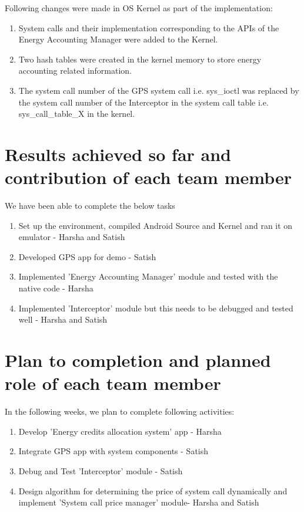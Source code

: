 Following changes were made in OS Kernel as part of the implementation: 

\begin{enumerate}	
	\item  System calls and their implementation corresponding to the APIs of the Energy Accounting Manager were added to the Kernel. 
	\item  Two hash tables were created in the kernel memory to store energy accounting related information. 
	\item The system call number of the GPS system call i.e. sys\_ioctl was replaced by the system call number of the Interceptor in the system call table i.e. sys\_call\_table\_X in the kernel.
\end{enumerate}

\section{Results achieved so far and contribution of each team member}

We have been able to complete the below tasks
\begin{enumerate}
	\item Set up the environment, compiled Android Source and Kernel and ran it on emulator - Harsha and Satish
	\item Developed GPS app for demo - Satish
	\item Implemented 'Energy Accounting Manager' module and tested with the native code - Harsha 
	\item Implemented 'Interceptor' module but this needs to be debugged and tested well - Harsha and Satish

\end{enumerate}

\section{Plan to completion and planned role of each team member}

 In the following weeks, we plan to complete following activities:
\begin{enumerate}
	\item Develop 'Energy credits allocation system' app - Harsha
	\item Integrate GPS app with system components   - Satish 
	\item Debug and Test 'Interceptor' module  - Satish
	\item Design algorithm for determining the price of system call dynamically and implement 'System call price manager' module- Harsha and Satish
	
\end{enumerate}

